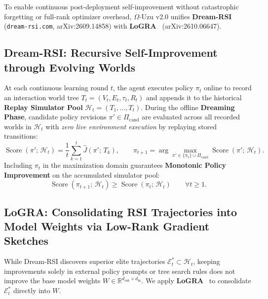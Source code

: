 \documentclass[10pt,a4paper]{article}
\begin{document}
To enable continuous post-deployment self-improvement without catastrophic forgetting or full-rank optimizer overhead, $\Omega$-Uzu v2.0 unifies \textbf{Dream-RSI}~\cite{dreamrsi2026} (\texttt{dream-rsi.com}, arXiv:2609.14858) with \textbf{LoGRA}~\cite{logra2026} (arXiv:2610.06647).

\subsection{Dream-RSI: Recursive Self-Improvement through Evolving Worlds}
At each continuous learning round $t$, the agent executes policy $\pi_t$ online to record an interaction world tree $T_t = (V_t, E_t, \tau_t, R_t)$ and appends it to the historical \textbf{Replay Simulator Pool} $\mathcal{H}_t = (T_1, \dots, T_t)$. During the offline \textbf{Dreaming Phase}, candidate policy revisions $\pi' \in \Pi_{\mathrm{cand}}$ are evaluated across all recorded worlds in $\mathcal{H}_t$ with \emph{zero live environment execution} by replaying stored transitions:
\begin{equation}
  \operatorname{Score}(\pi';\, \mathcal{H}_t) = \frac{1}{t} \sum_{k=1}^{t} \widehat{J}(\pi';\, T_k), \qquad \pi_{t+1} = \arg\max_{\pi' \in \{\pi_t\} \cup \Pi_{\mathrm{cand}}} \operatorname{Score}(\pi';\, \mathcal{H}_t).
\end{equation}
Including $\pi_t$ in the maximization domain guarantees \textbf{Monotonic Policy Improvement} on the accumulated simulator pool:
\begin{equation}
  \operatorname{Score}(\pi_{t+1};\, \mathcal{H}_t) \ge \operatorname{Score}(\pi_t;\, \mathcal{H}_t) \qquad \forall t \ge 1.
\end{equation}

\subsection{LoGRA: Consolidating RSI Trajectories into Model Weights via Low-Rank Gradient Sketches}
While Dream-RSI discovers superior elite trajectories $\mathcal{E}_t^* \subset \mathcal{H}_t$, keeping improvements solely in external policy prompts or tree search rules does not improve the base model weights $W \in \mathbb{R}^{d_{\mathrm{out}} \times d_{\mathrm{in}}}$. We apply \textbf{LoGRA}~\cite{logra2026} to consolidate $\mathcal{E}_t^*$ directly into $W$.
\end{document}
